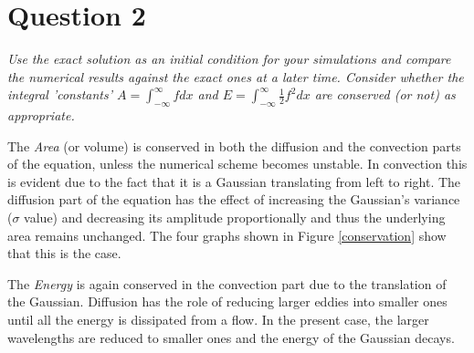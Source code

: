 \section*{Question 2}

\emph{Use the exact solution as an initial condition for your simulations and compare the numerical results
against the exact ones at a later time. Consider whether the integral ’constants’ $A = \int_{-\infty}^\infty f dx$ and $  E =  \int_{-\infty}^\infty \tfrac{1}{2} f^2 dx$ are conserved (or not) as appropriate.}

The \emph{Area} (or volume) is conserved in both the diffusion and the convection parts of the equation, unless the numerical scheme becomes unstable. In convection this is evident due to the fact that it is a Gaussian translating from left to right. The diffusion part of the equation has the effect of increasing the Gaussian's variance ($\sigma$ value) and decreasing its amplitude proportionally and thus the underlying area remains unchanged. The four graphs shown in Figure \ref{conservation} show that this is the case.

The \emph{Energy} is again conserved in the convection part due to the translation of the Gaussian. Diffusion has the role of reducing larger eddies into smaller ones until all the energy is dissipated from a flow. In the present case, the larger wavelengths are reduced to smaller ones and the energy of the Gaussian decays.